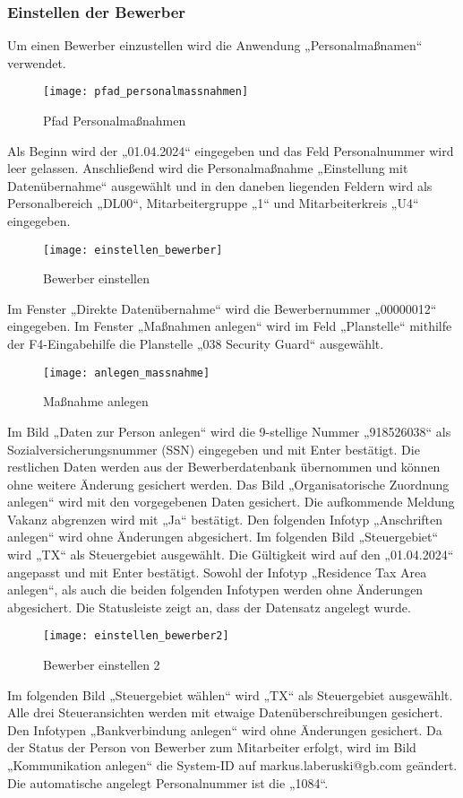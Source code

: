 \subsubsection{Einstellen der Bewerber}
Um einen Bewerber einzustellen wird die Anwendung „Personalmaßnamen“ verwendet.
\begin{figure}[H]
	\centering
	\texttt{[image: pfad\_personalmassnahmen]}
	\caption{Pfad Personalmaßnahmen}
	\label{fig:pfad_personalmassnahmen2}
\end{figure}
Als Beginn wird der „01.04.2024“ eingegeben und das Feld Personalnummer wird leer gelassen. Anschließend wird die Personalmaßnahme „Einstellung mit Datenübernahme“ ausgewählt und in den daneben liegenden Feldern wird als Personalbereich „DL00“, Mitarbeitergruppe „1“ und Mitarbeiterkreis „U4“ eingegeben.
\begin{figure}[H]
	\centering
	\texttt{[image: einstellen\_bewerber]}
	\caption{Bewerber einstellen}
	\label{fig:einstellen_bewerber}
\end{figure}
Im Fenster „Direkte Datenübernahme“ wird die Bewerbernummer „00000012“ eingegeben. Im Fenster „Maßnahmen anlegen“ wird im Feld „Planstelle“ mithilfe der F4-Eingabehilfe die Planstelle „038 Security Guard“ ausgewählt.
\begin{figure}[H]
	\centering
	\texttt{[image: anlegen\_massnahme]}
	\caption{Maßnahme anlegen}
	\label{fig:anlegen_massnahme}
\end{figure}
Im Bild „Daten zur Person anlegen“ wird die 9-stellige Nummer „918526038“ als Sozialversicherungsnummer (SSN) eingegeben und mit Enter bestätigt. Die restlichen Daten werden aus der Bewerberdatenbank übernommen und können ohne weitere Änderung gesichert werden. Das Bild „Organisatorische Zuordnung anlegen“ wird mit den vorgegebenen Daten gesichert. Die aufkommende Meldung Vakanz abgrenzen wird mit „Ja“ bestätigt. Den folgenden Infotyp „Anschriften anlegen“ wird ohne Änderungen abgesichert. Im folgenden Bild „Steuergebiet“ wird „TX“ als Steuergebiet ausgewählt. Die Gültigkeit wird auf den „01.04.2024“ angepasst und mit Enter bestätigt. Sowohl der Infotyp „Residence Tax Area anlegen“, als auch die beiden folgenden Infotypen werden ohne Änderungen abgesichert. Die Statusleiste zeigt an, dass der Datensatz angelegt wurde.
\begin{figure}[H]
	\centering
	\texttt{[image: einstellen\_bewerber2]}
	\caption{Bewerber einstellen 2}
	\label{fig:einstellen_bewerber2}
\end{figure}
Im folgenden Bild „Steuergebiet wählen“ wird „TX“ als Steuergebiet ausgewählt. Alle drei Steueransichten werden mit etwaige Datenüberschreibungen gesichert. Den Infotypen „Bankverbindung anlegen“ wird ohne Änderungen gesichert. Da der Status der Person von Bewerber zum Mitarbeiter erfolgt, wird im Bild „Kommunikation anlegen“ die System-ID auf markus.laberuski@gb.com geändert. Die automatische angelegt Personalnummer ist die „1084“.


